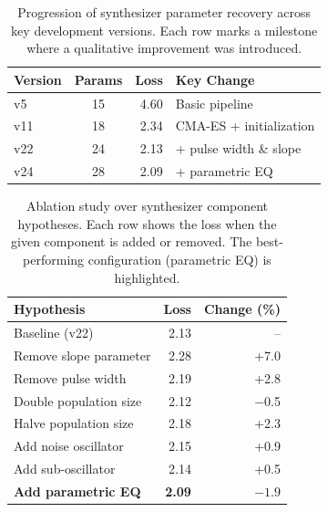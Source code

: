 
\begin{table}[ht]
\centering
\caption{Progression of synthesizer parameter recovery across key development versions. Each row marks a milestone where a qualitative improvement was introduced.}
\label{tab:progression}
\begin{tabular}{@{}lcrl@{}}
\toprule
\textbf{Version} & \textbf{Params} & \textbf{Loss} & \textbf{Key Change} \\
\midrule
v5  & 15 & 4.60 & Basic pipeline \\
v11 & 18 & 2.34 & CMA-ES + initialization \\
v22 & 24 & 2.13 & + pulse width \& slope \\
v24 & 28 & 2.09 & + parametric EQ \\
\bottomrule
\end{tabular}
\end{table}

\begin{table}[ht]
\centering
\caption{Ablation study over synthesizer component hypotheses. Each row shows the loss when the given component is added or removed. The best-performing configuration (parametric EQ) is highlighted.}
\label{tab:hypotheses}
\begin{tabular}{@{}lrr@{}}
\toprule
\textbf{Hypothesis} & \textbf{Loss} & \textbf{Change (\%)} \\
\midrule
Baseline (v22)            & 2.13 &   --    \\
Remove slope parameter    & 2.28 & +7.0  \\
Remove pulse width        & 2.19 & +2.8  \\
Double population size     & 2.12 & $-$0.5 \\
Halve population size      & 2.18 & +2.3  \\
Add noise oscillator       & 2.15 & +0.9  \\
Add sub-oscillator         & 2.14 & +0.5  \\
\textbf{Add parametric EQ} & \textbf{2.09} & $\mathbf{-1.9}$ \quad{\color{green!60!black}$\boldsymbol{\checkmark}$} \\
\bottomrule
\end{tabular}
\end{table}

